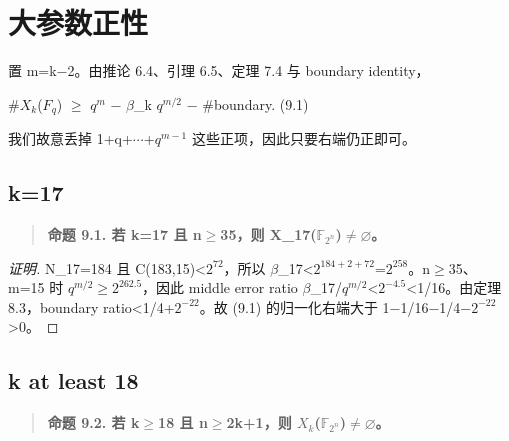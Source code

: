\documentclass[11pt]{ctexart}
\begin{document}
\section{大参数正性}

置 m=k−2。由推论 6.4、引理 6.5、定理 7.4 与 boundary identity，

\#\ensuremath{X_{k}}(\ensuremath{F_{q}}) \ensuremath{\ge} \ensuremath{q^{m}} − \ensuremath{\beta}\_k \ensuremath{q^{m/2}} − \#boundary.    (9.1)

我们故意丢掉 1+q+\ensuremath{\cdots}+\ensuremath{q^{m−1}} 这些正项，因此只要右端仍正即可。

\subsection{k=17}

\begin{quote}\textbf{命题 9.1. 若 k=17 且 n\ensuremath{\ge}35，则 X\_17(\ensuremath{\mathbb F_{2^n}})\ensuremath{\ne}\ensuremath{\varnothing}。}\end{quote}

\begin{proof}[证明] 

N\_17=184 且 C(183,15)<\ensuremath{2^{72}}，所以 \ensuremath{\beta}\_17<\ensuremath{2^{184+2+72}}=\ensuremath{2^{258}}。n\ensuremath{\ge}35、m=15 时 \ensuremath{q^{m/2}}\ensuremath{\ge}\ensuremath{2^{262.5}}，因此 middle error ratio \ensuremath{\beta}\_17/\ensuremath{q^{m/2}}<\ensuremath{2^{-4.5}}<1/16。由定理 8.3，boundary ratio<1/4+\ensuremath{2^{-22}}。故 (9.1) 的归一化右端大于 1−1/16−1/4−\ensuremath{2^{-22}}>0。

\end{proof}

\subsection{k at least 18}

\begin{quote}\textbf{命题 9.2. 若 k\ensuremath{\ge}18 且 n\ensuremath{\ge}2k+1，则 \ensuremath{X_{k}}(\ensuremath{\mathbb F_{2^n}})\ensuremath{\ne}\ensuremath{\varnothing}。}\end{quote}
\end{document}
